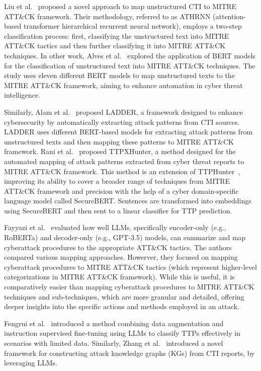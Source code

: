 Liu et al.~\cite{liu2022threat} proposed a novel approach to map unstructured CTI to MITRE ATT\&CK framework. 
Their methodology, referred to as ATHRNN (attention-based transformer hierarchical recurrent neural network), employs a two-step classification process: first, classifying the unstructured text into MITRE ATT\&CK tactics and then further classifying it into MITRE ATT\&CK techniques.
In other work, Alves et al.~\cite{alves2022leveraging} explored the application of BERT models for the classification of unstructured text into MITRE ATT\&CK techniques.
The study uses eleven different BERT models to map unstructured texts to the MITRE ATT\&CK framework, aiming to enhance automation in cyber threat intelligence.

Similarly, Alam et al.~\cite{alam2023looking} proposed LADDER, a framework designed to enhance cybersecurity by automatically extracting attack patterns from CTI sources.
LADDER uses different BERT-based models for extracting attack patterns from unstructured texts and then mapping these patterns to MITRE ATT\&CK framework.
Rani et al.~\cite{rani2024ttpxhunter} proposed TTPXHunter, a method designed for the automated mapping of attack patterns extracted from cyber threat reports to MITRE ATT\&CK framework. 
This method is an extension of TTPHunter~\cite{ttp_hunter}, improving its ability to cover a broader range of techniques from MITRE ATT\&CK framework and precision with the help of a cyber domain-specific language model called SecureBERT.
Sentences are transformed into embeddings using SecureBERT and then sent to a linear classifier for TTP prediction.

Fayyazi et al.~\cite{fayyazi2023advancing} evaluated how well LLMs, specifically encoder-only (e.g., RoBERTa) and decoder-only (e.g., GPT-3.5) models, can summarize and map cyberattack procedures to the appropriate ATT\&CK tactics.
The authors compared various mapping approaches. 
Howerver, they focused on mapping cyberattack procedures to MITRE ATT\&CK tactics (which represent higher-level categorizations in MITRE ATT\&CK framework). 
While this is useful, it is comparatively easier than mapping cyberattack procedures to MITRE ATT\&CK techniques and sub-techniques, which are more granular and detailed, offering deeper insights into the specific actions and methods employed in an attack.

Fengrui et al.~\cite{fengrui2024few} introduced a method combining data augmentation and instruction supervised fine-tuning using LLMs to classify TTPs effectively in scenarios with limited data.
Similarly, Zhang et al.~\cite{zhang2024attackgboosting} introduced a novel framework for constructing attack knowledge graphs (KGs) from CTI reports, by leveraging LLMs. 

